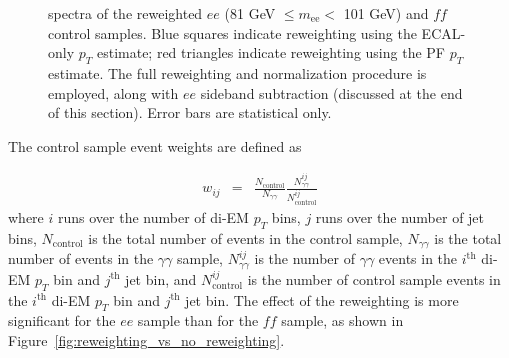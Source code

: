 \documentclass[dissertation.tex]{subfiles}
\begin{document}
\begin{figure}
	\hspace{1cm}
	\caption{\MET spectra of the reweighted $ee$ (81 GeV $\leq m_{\mathrm{ee}} <$ 101 GeV) and $\mathit{ff}$ control samples.  Blue squares indicate reweighting using the ECAL-only $p_{T}$ estimate; red triangles indicate reweighting using the PF $p_{T}$ estimate.  The full reweighting and normalization procedure is employed, along with $ee$ sideband subtraction (discussed at the end of this section).  Error bars are statistical only.}
	\label{fig:ee_vs_ff_di-EM_vs_dijet_pT_reweighting}
\end{figure}

The control sample event weights are defined as

\begin{eqnarray}
w_{ij} &=& \frac{N_{\mathrm{control}}}{N_{\gamma\gamma}}\frac{N_{\gamma\gamma}^{ij}}{N_{\mathrm{control}}^{ij}}
\end{eqnarray}
%
where $i$ runs over the number of di-EM $p_{T}$ bins, $j$ runs over the number of jet bins, $N_{\mathrm{control}}$ is the total number of events in the control sample, $N_{\gamma\gamma}$ is the total number of events in the $\gamma\gamma$ sample, $N_{\gamma\gamma}^{ij}$ is the number of $\gamma\gamma$ events in the $i^{\mathrm{th}}$ di-EM $p_{T}$ bin and $j^{\mathrm{th}}$ jet bin, and $N_{\mathrm{control}}^{ij}$ is the number of control sample events in the $i^{\mathrm{th}}$ di-EM $p_{T}$ bin and $j^{\mathrm{th}}$ jet bin.  The effect of the reweighting is more significant for the $ee$ sample than for the $\mathit{ff}$ sample, as shown in Figure~\ref{fig:reweighting_vs_no_reweighting}.
\end{document}

